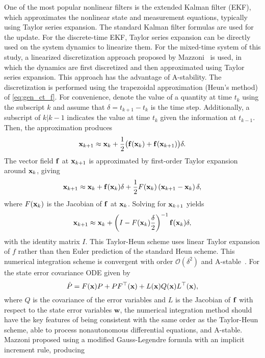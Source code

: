 \documentclass[../zhang_thesis.tex]{subfiles}
\begin{document}
One of the most popular nonlinear filters is the extended Kalman filter (EKF), which approximates the nonlinear state and measurement equations, typically using Taylor series expansion. The standard Kalman filter formulas are used for the update. For the discrete-time EKF, Taylor series expansion can be directly used on the system dynamics to linearize them. For the mixed-time system of this study, a linearized discretization approach proposed by Mazzoni~\cite{mazzoni07} is used, in
which the dynamics are first discretized and then approximated using Taylor series expansion. This approach has the advantage of A-stability. The discretization is performed using the trapezoidal approximation (Heun's method) of \cref{eq:gen_ct_f}. For convenience, denote the value of a quantity at time $t_k$ using the subscript $k$ and assume that $\delta=t_{k+1}-t_k$ is the time step. Additionally, a subscript of $k|k-1$ indicates the value at time $t_k$ given the information at
$t_{k-1}$. Then, the approximation produces
\begin{equation}
    \mathbf{x}_{k+1} \approx \mathbf{x}_k + \frac{1}{2} \big( \mathbf{f}(\mathbf{x}_k) + \mathbf{f}(\mathbf{x}_{k+1}) \big) \delta.
\end{equation}
The vector field $\mathbf{f}$ at $\mathbf{x}_{k+1}$ is approximated by first-order Taylor expansion around $\mathbf{x}_k$, giving
\begin{equation}
    \mathbf{x}_{k+1} \approx \mathbf{x}_k + \mathbf{f}(\mathbf{x}_k)\delta + \frac{1}{2} F(\mathbf{x}_k) \left( \mathbf{x}_{k+1} - \mathbf{x}_k \right) \delta,
\end{equation}
where $F(\mathbf{x}_k)$ is the Jacobian of $\mathbf{f}$ at $\mathbf{x}_k$. Solving for $\mathbf{x}_{k+1}$ yields
\begin{equation}
    \mathbf{x}_{k+1} \approx \mathbf{x}_k + \left( I - F(\mathbf{x}_k) \frac{\delta}{2} \right)^{-1} \mathbf{f}(\mathbf{x}_k) \delta,
\end{equation}
with the identity matrix $I$. This Taylor-Heun scheme uses linear Taylor expansion of $f$ rather than then Euler prediction of the standard Heun scheme. This numerical integration scheme is convergent with order $\mathcal{O}(\delta^2)$ and A-stable~\cite{mazzoni07}. For the state error covariance ODE given by
\begin{equation}
    \dot{P} = F(\mathbf{x}) P + P F^\top(\mathbf{x}) + L(\mathbf{x}) Q(\mathbf{x}) L^\top(\mathbf{x}),
\end{equation}
where $Q$ is the covariance of the error variables and $L$ is the Jacobian of $\mathbf{f}$ with respect to the state error variables $\mathbf{w}$, the numerical integration method should have the key features of being consistent with the same order as the Taylor-Heun scheme, able to process nonautonomous differential equations, and A-stable. Mazzoni proposed using a modified Gauss-Legendre formula with an implicit increment rule, producing
\end{document}
